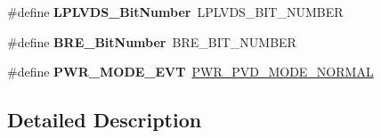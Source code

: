 \begin{DoxyCompactItemize}
\mbox{\label{group___h_a_l___p_w_r___aliased_ga7ebe7d965ce7638645ee9a5e35c01be7}} 
\#define {\bfseries L\+P\+L\+V\+D\+S\+\_\+\+Bit\+Number}~L\+P\+L\+V\+D\+S\+\_\+\+B\+I\+T\+\_\+\+N\+U\+M\+B\+ER
\item 
\mbox{\label{group___h_a_l___p_w_r___aliased_ga1a0832bfe421cdd6f2640ffb625cc2d8}} 
\#define {\bfseries B\+R\+E\+\_\+\+Bit\+Number}~B\+R\+E\+\_\+\+B\+I\+T\+\_\+\+N\+U\+M\+B\+ER
\item 
\mbox{\label{group___h_a_l___p_w_r___aliased_ga1092f618f6edca6f56e410e926455774}} 
\#define {\bfseries P\+W\+R\+\_\+\+M\+O\+D\+E\+\_\+\+E\+VT}~\mbox{\hyperlink{group___p_w_r___p_v_d___mode_ga3a4bf701a36a14a4edf4dc5a28153277}{P\+W\+R\+\_\+\+P\+V\+D\+\_\+\+M\+O\+D\+E\+\_\+\+N\+O\+R\+M\+AL}}
\end{DoxyCompactItemize}


\subsection{Detailed Description}
